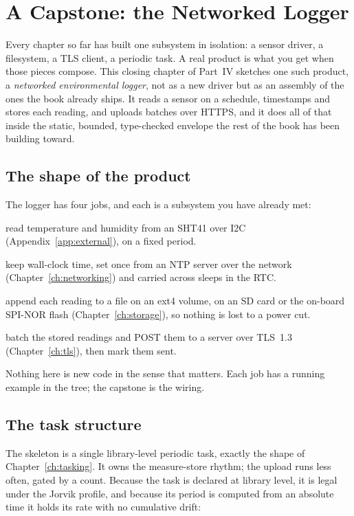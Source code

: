 \chapter{A Capstone: the Networked Logger}
\label{ch:capstone}

Every chapter so far has built one subsystem in isolation: a sensor driver, a
filesystem, a TLS client, a periodic task. A real product is what you get when those
pieces compose. This closing chapter of Part~IV sketches one such product, a
\emph{networked environmental logger}, not as a new driver but as an assembly of the
ones the book already ships. It reads a sensor on a schedule, timestamps and stores
each reading, and uploads batches over HTTPS, and it does all of that inside the
static, bounded, type-checked envelope the rest of the book has been building toward.

\section{The shape of the product}

The logger has four jobs, and each is a subsystem you have already met:

\begin{description}[style=nextline, leftmargin=0pt]
\item[Measure] read temperature and humidity from an SHT41 over I2C
  (Appendix~\ref{app:external}), on a fixed period.
\item[Timestamp] keep wall-clock time, set once from an NTP server over the network
  (Chapter~\ref{ch:networking}) and carried across sleeps in the RTC.
\item[Store] append each reading to a file on an ext4 volume, on an SD card or the
  on-board SPI-NOR flash (Chapter~\ref{ch:storage}), so nothing is lost to a power
  cut.
\item[Upload] batch the stored readings and POST them to a server over TLS~1.3
  (Chapter~\ref{ch:tls}), then mark them sent.
\end{description}

Nothing here is new code in the sense that matters. Each job has a running example in
the tree; the capstone is the wiring.

\section{The task structure}

The skeleton is a single library-level periodic task, exactly the shape of
Chapter~\ref{ch:tasking}. It owns the measure-store rhythm; the upload runs less
often, gated by a count. Because the task is declared at library level, it is legal
under the Jorvik profile, and because its period is computed from an absolute time it
holds its rate with no cumulative drift:

